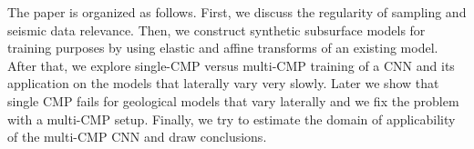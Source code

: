 \documentclass[paper,twocolomn]{geophysics}
\begin{document}
The paper is organized as follows. First, we discuss the regularity of sampling and seismic data relevance.
%
Then, we construct synthetic subsurface models for training purposes by using elastic and affine transforms of an existing model.
%
After that, we explore single-CMP versus multi-CMP training of a CNN and its application on the models that laterally vary very slowly.
%
Later we show that single CMP fails for geological models that vary laterally and we fix the problem with a multi-CMP setup.
%
Finally, we try to estimate the domain of applicability of the multi-CMP CNN and draw conclusions.



%
%
%
%
%
%
%
%
%
%
%
%
%
%
%
%
%
%
%
% 
%
%
\end{document}

